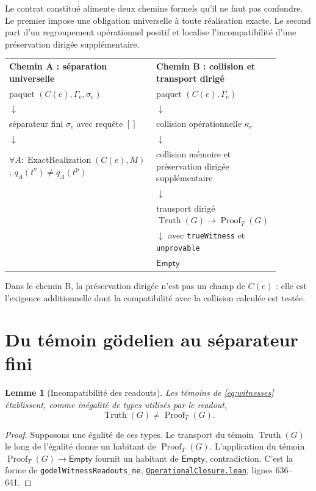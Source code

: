 \documentclass[11pt,a4paper]{article}
\newcommand{\Truth}{\operatorname{Truth}}
\newcommand{\Proof}{\operatorname{Proof}}
\newcommand{\ExactRealization}{\operatorname{ExactRealization}}
\newcommand{\Empty}{\mathsf{Empty}}
\newcommand{\code}[1]{\nolinkurl{#1}}
\newcommand{\SourceAt}[3]{\href{https://github.com/JohnDoe-collab-stack/relational-perimeter/blob/1e5aeda745559d62a3819bb3213da7fce3c31ad1/#1\#L#2}{\nolinkurl{#3}}}
\newtheorem{lemme}[theoreme]{Lemme}
\theoremstyle{remark}
\begin{document}
Le contrat constitué alimente deux chemins formels qu'il ne faut pas
confondre. Le premier impose une obligation universelle à toute réalisation
exacte. Le second part d'un regroupement opérationnel positif et localise
l'incompatibilité d'une préservation dirigée supplémentaire.

\begin{center}
\renewcommand{\arraystretch}{1.25}
\begin{tabular}{>{\centering\arraybackslash}p{0.44\linewidth}
                >{\centering\arraybackslash}p{0.44\linewidth}}
\textbf{Chemin A : séparation universelle}
& \textbf{Chemin B : collision et transport dirigé} \\
paquet $(C(e),\Gamma_e,\sigma_e)$ & paquet $(C(e),\Gamma_e)$ \\
$\downarrow$ & $\downarrow$ \\
séparateur fini $\sigma_e$ avec requête $[]$ & collision opérationnelle $\kappa_e$ \\
$\downarrow$ & $\downarrow$ \\
$\forall A:\ExactRealization(C(e),M)$,
$q_A(t^{\mathrm v})\neq q_A(t^{\mathrm p})$
& collision mémoire et préservation dirigée supplémentaire \\
& $\downarrow$ \\
& transport dirigé $\Truth(G)\to\Proof_T(G)$ \\
& $\downarrow$ avec \code{trueWitness} et \code{unprovable} \\
& $\Empty$
\end{tabular}
\end{center}

Dans le chemin B, la préservation dirigée n'est pas un champ de
$C(e)$ : elle est l'exigence additionnelle dont la compatibilité avec la
collision calculée est testée.

\section{Du témoin gödelien au séparateur fini}
\label{sec:separator}

\begin{lemme}[Incompatibilité des readouts]\label{lem:readout}
Les témoins de \eqref{eq:witnesses} établissent, comme inégalité de types
utilisés par le readout,
\[
\Truth(G)\neq\Proof_T(G).
\]
\end{lemme}
\begin{proof}
Supposons une égalité de ces types. Le transport du témoin
$\Truth(G)$ le long de l'égalité donne un habitant de $\Proof_T(G)$.
L'application du témoin $\Proof_T(G)\to\Empty$ fournit un habitant de
$\Empty$, contradiction. C'est la forme de
\code{godelWitnessReadouts\_ne},
\SourceAt{RelationalPerimeter/Constitution/Godel/OperationalClosure.lean}{636-L641}{OperationalClosure.lean},
lignes 636--641.
\end{proof}
\end{document}
